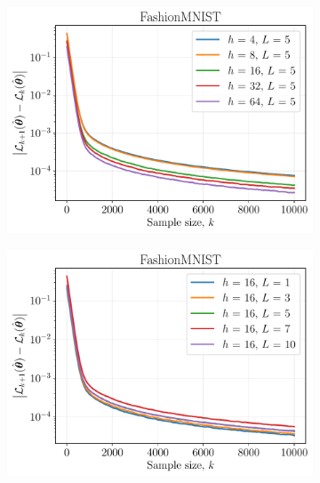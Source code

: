 \documentclass{article}
\begin{document}
\begin{figure}[ht]
  \begin{subfigure}[b]{0.5\linewidth}
    \centering
    \includegraphics[width=\linewidth]{figs_extraction/fashion_mnist_hidden_size.pdf} 
  \end{subfigure}%
  \begin{subfigure}[b]{0.5\linewidth}
    \centering
    \includegraphics[width=\linewidth]{figs_extraction/fashion_mnist_num_layers.pdf} 
  \end{subfigure} 
  \begin{subfigure}[b]{0.5\linewidth}
    \centering

\end{subfigure}
\end{figure}
\end{document}
